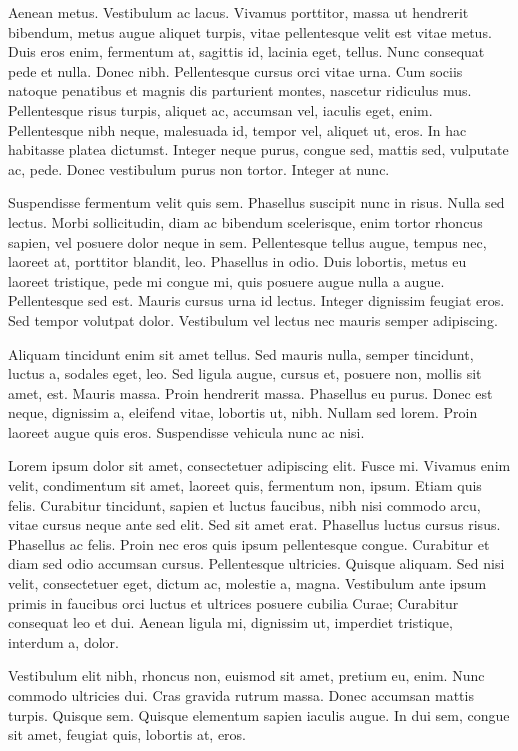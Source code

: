 \documentclass[../hdr.tex]{subfiles}
\begin{document}
Aenean metus. Vestibulum ac lacus. Vivamus porttitor, massa ut hendrerit
bibendum, metus augue aliquet turpis, vitae pellentesque velit est vitae metus.
Duis eros enim, fermentum at, sagittis id, lacinia eget, tellus. Nunc consequat
pede et nulla. Donec nibh. Pellentesque cursus orci vitae urna. Cum sociis
natoque penatibus et magnis dis parturient montes, nascetur ridiculus mus.
Pellentesque risus turpis, aliquet ac, accumsan vel, iaculis eget, enim.
Pellentesque nibh neque, malesuada id, tempor vel, aliquet ut, eros. In hac
habitasse platea dictumst. Integer neque purus, congue sed, mattis sed,
vulputate ac, pede. Donec vestibulum purus non tortor. Integer at nunc.

Suspendisse fermentum velit quis sem. Phasellus suscipit nunc in risus. Nulla
sed lectus. Morbi sollicitudin, diam ac bibendum scelerisque, enim tortor
rhoncus sapien, vel posuere dolor neque in sem. Pellentesque tellus augue,
tempus nec, laoreet at, porttitor blandit, leo. Phasellus in odio. Duis
lobortis, metus eu laoreet tristique, pede mi congue mi, quis posuere augue
nulla a augue. Pellentesque sed est. Mauris cursus urna id lectus. Integer
dignissim feugiat eros. Sed tempor volutpat dolor. Vestibulum vel lectus nec
mauris semper adipiscing.

Aliquam tincidunt enim sit amet tellus. Sed mauris nulla, semper tincidunt,
luctus a, sodales eget, leo. Sed ligula augue, cursus et, posuere non, mollis
sit amet, est. Mauris massa. Proin hendrerit massa. Phasellus eu purus. Donec
est neque, dignissim a, eleifend vitae, lobortis ut, nibh. Nullam sed lorem.
Proin laoreet augue quis eros. Suspendisse vehicula nunc ac nisi.

Lorem ipsum dolor sit amet, consectetuer adipiscing elit. Fusce mi. Vivamus enim
velit, condimentum sit amet, laoreet quis, fermentum non, ipsum. Etiam quis
felis. Curabitur tincidunt, sapien et luctus faucibus, nibh nisi commodo arcu,
vitae cursus neque ante sed elit. Sed sit amet erat. Phasellus luctus cursus
risus. Phasellus ac felis. Proin nec eros quis ipsum pellentesque congue.
Curabitur et diam sed odio accumsan cursus. Pellentesque ultricies. Quisque
aliquam. Sed nisi velit, consectetuer eget, dictum ac, molestie a, magna.
Vestibulum ante ipsum primis in faucibus orci luctus et ultrices posuere cubilia
Curae; Curabitur consequat leo et dui. Aenean ligula mi, dignissim ut, imperdiet
tristique, interdum a, dolor.

Vestibulum elit nibh, rhoncus non, euismod sit amet, pretium eu, enim. Nunc
commodo ultricies dui. Cras gravida rutrum massa. Donec accumsan mattis turpis.
Quisque sem. Quisque elementum sapien iaculis augue. In dui sem, congue sit
amet, feugiat quis, lobortis at, eros.
\end{document}
